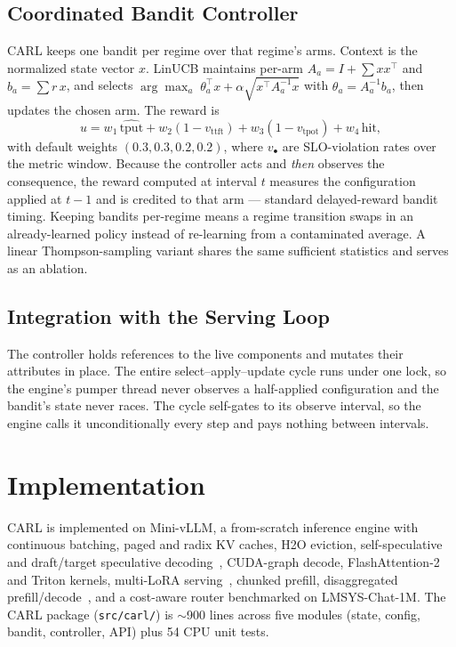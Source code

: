 \documentclass[10pt,twocolumn]{article}
\begin{document}
\subsection{Coordinated Bandit Controller}
\label{sec:bandit}

CARL keeps one bandit per regime over that regime's arms. Context is the
normalized state vector $x$. LinUCB maintains per-arm $A_a = I + \sum x x^\top$
and $b_a = \sum r\,x$, and selects
$\arg\max_a\; \theta_a^\top x + \alpha\sqrt{x^\top A_a^{-1} x}$ with
$\theta_a = A_a^{-1} b_a$, then updates the chosen arm. The reward is
\[
u = w_1\,\widehat{\text{tput}} + w_2(1{-}v_{\text{ttft}}) + w_3(1{-}v_{\text{tpot}}) + w_4\,\text{hit},
\]
with default weights $(0.3, 0.3, 0.2, 0.2)$, where $v_\bullet$ are SLO-violation
rates over the metric window. Because the controller acts and \emph{then}
observes the consequence, the reward computed at interval $t$ measures the
configuration applied at $t{-}1$ and is credited to that arm --- standard
delayed-reward bandit timing. Keeping bandits per-regime means a regime
transition swaps in an already-learned policy instead of re-learning from a
contaminated average. A linear Thompson-sampling variant shares the same
sufficient statistics and serves as an ablation.

\subsection{Integration with the Serving Loop}
\label{sec:integration}

The controller holds references to the live components and mutates their
attributes in place. The entire select--apply--update cycle runs under one lock,
so the engine's pumper thread never observes a half-applied configuration and
the bandit's state never races. The cycle self-gates to its observe interval, so
the engine calls it unconditionally every step and pays nothing between
intervals.

\section{Implementation}
\label{sec:impl}

CARL is implemented on Mini-vLLM, a from-scratch inference engine with
continuous batching, paged and radix KV caches, H2O eviction, self-speculative
and draft/target speculative decoding~\cite{leviathan2023speculative}, CUDA-graph
decode, FlashAttention-2~\cite{dao2023flashattention2} and Triton kernels,
multi-LoRA serving~\cite{sheng2024slora}, chunked prefill, disaggregated
prefill/decode~\cite{zhong2024distserve}, and a cost-aware router benchmarked on
LMSYS-Chat-1M. The CARL package (\texttt{src/carl/}) is $\sim$900 lines across
five modules (state, config, bandit, controller, API) plus 54 CPU unit tests.
\end{document}
